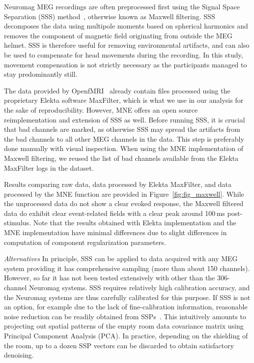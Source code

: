 Neuromag MEG recordings are often preprocessed first using the Signal Space Separation (SSS) method~\citep{taulu2006spatiotemporal}, otherwise known as Maxwell filtering. SSS decomposes the data using multipole moments based on spherical harmonics and removes the component of magnetic field originating from outside the MEG helmet. SSS is therefore useful for removing environmental artifacts, and can also be used to compensate for head movements during the recording. In this study, movement compensation is not strictly necessary as the participants managed to stay predominantly still.

The data provided by OpenfMRI~\citep{poldrack2017openfmri} already contain files processed using the proprietary Elekta software MaxFilter, which is what we use in our analysis for the sake of reproducibility. However, MNE offers an open source reimplementation and extension of SSS as well. Before running SSS, it is crucial that bad channels are marked, as otherwise SSS may spread the artifacts from the bad channels to all other MEG channels in the data. This step is preferably done manually with visual inspection. When using the MNE implementation of Maxwell filtering, we reused the list of bad channels available from the Elekta MaxFilter logs in the dataset.

Results comparing raw data, data processed by Elekta MaxFilter, and data processed by the MNE  function are provided in Figure~\ref{fig:fig_maxwell}. While the unprocessed data do not show a clear evoked response, the Maxwell filtered data do exhibit clear event-related fields with a clear peak around 100\,ms post-stimulus. Note that the results obtained with Elekta implementation and the MNE implementation have minimal differences due to slight differences in computation of component regularization parameters.

\emph{Alternatives} In principle, SSS can be applied to data acquired with any MEG system providing it has comprehensive sampling (more than  about 150 channels). However, so far it has not been tested extensively with other than the 306-channel Neuromag systems. SSS requires relatively high calibration accuracy, and the Neuromag systems are thus carefully calibrated for this purpose. If SSS is not an option, for example due to the lack of fine-calibration information, reasonable noise reduction can be readily obtained from \acp{SSP}~\citep{uusitalo1997signal}. This intuitively amounts to projecting out spatial patterns of the empty room data covariance matrix using Principal Component Analysis (PCA). In practice, depending on the shielding of the room, up to a dozen SSP vectors can be discarded to obtain satisfactory denoising.

